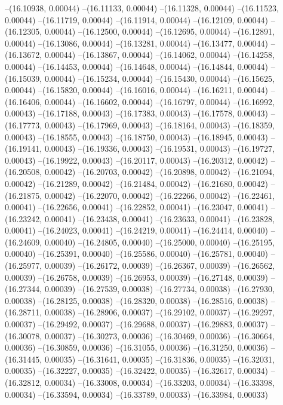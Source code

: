--(16.10938, 0.00044)
--(16.11133, 0.00044)
--(16.11328, 0.00044)
--(16.11523, 0.00044)
--(16.11719, 0.00044)
--(16.11914, 0.00044)
--(16.12109, 0.00044)
--(16.12305, 0.00044)
--(16.12500, 0.00044)
--(16.12695, 0.00044)
--(16.12891, 0.00044)
--(16.13086, 0.00044)
--(16.13281, 0.00044)
--(16.13477, 0.00044)
--(16.13672, 0.00044)
--(16.13867, 0.00044)
--(16.14062, 0.00044)
--(16.14258, 0.00044)
--(16.14453, 0.00044)
--(16.14648, 0.00044)
--(16.14844, 0.00044)
--(16.15039, 0.00044)
--(16.15234, 0.00044)
--(16.15430, 0.00044)
--(16.15625, 0.00044)
--(16.15820, 0.00044)
--(16.16016, 0.00044)
--(16.16211, 0.00044)
--(16.16406, 0.00044)
--(16.16602, 0.00044)
--(16.16797, 0.00044)
--(16.16992, 0.00043)
--(16.17188, 0.00043)
--(16.17383, 0.00043)
--(16.17578, 0.00043)
--(16.17773, 0.00043)
--(16.17969, 0.00043)
--(16.18164, 0.00043)
--(16.18359, 0.00043)
--(16.18555, 0.00043)
--(16.18750, 0.00043)
--(16.18945, 0.00043)
--(16.19141, 0.00043)
--(16.19336, 0.00043)
--(16.19531, 0.00043)
--(16.19727, 0.00043)
--(16.19922, 0.00043)
--(16.20117, 0.00043)
--(16.20312, 0.00042)
--(16.20508, 0.00042)
--(16.20703, 0.00042)
--(16.20898, 0.00042)
--(16.21094, 0.00042)
--(16.21289, 0.00042)
--(16.21484, 0.00042)
--(16.21680, 0.00042)
--(16.21875, 0.00042)
--(16.22070, 0.00042)
--(16.22266, 0.00042)
--(16.22461, 0.00041)
--(16.22656, 0.00041)
--(16.22852, 0.00041)
--(16.23047, 0.00041)
--(16.23242, 0.00041)
--(16.23438, 0.00041)
--(16.23633, 0.00041)
--(16.23828, 0.00041)
--(16.24023, 0.00041)
--(16.24219, 0.00041)
--(16.24414, 0.00040)
--(16.24609, 0.00040)
--(16.24805, 0.00040)
--(16.25000, 0.00040)
--(16.25195, 0.00040)
--(16.25391, 0.00040)
--(16.25586, 0.00040)
--(16.25781, 0.00040)
--(16.25977, 0.00039)
--(16.26172, 0.00039)
--(16.26367, 0.00039)
--(16.26562, 0.00039)
--(16.26758, 0.00039)
--(16.26953, 0.00039)
--(16.27148, 0.00039)
--(16.27344, 0.00039)
--(16.27539, 0.00038)
--(16.27734, 0.00038)
--(16.27930, 0.00038)
--(16.28125, 0.00038)
--(16.28320, 0.00038)
--(16.28516, 0.00038)
--(16.28711, 0.00038)
--(16.28906, 0.00037)
--(16.29102, 0.00037)
--(16.29297, 0.00037)
--(16.29492, 0.00037)
--(16.29688, 0.00037)
--(16.29883, 0.00037)
--(16.30078, 0.00037)
--(16.30273, 0.00036)
--(16.30469, 0.00036)
--(16.30664, 0.00036)
--(16.30859, 0.00036)
--(16.31055, 0.00036)
--(16.31250, 0.00036)
--(16.31445, 0.00035)
--(16.31641, 0.00035)
--(16.31836, 0.00035)
--(16.32031, 0.00035)
--(16.32227, 0.00035)
--(16.32422, 0.00035)
--(16.32617, 0.00034)
--(16.32812, 0.00034)
--(16.33008, 0.00034)
--(16.33203, 0.00034)
--(16.33398, 0.00034)
--(16.33594, 0.00034)
--(16.33789, 0.00033)
--(16.33984, 0.00033)
